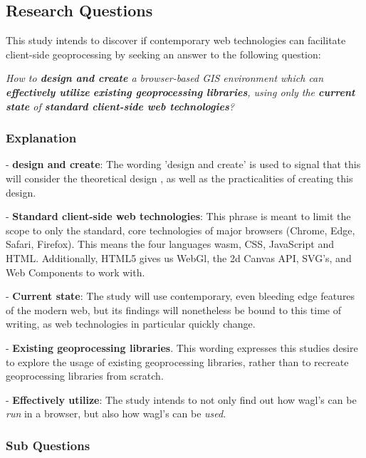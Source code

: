 \subsection{Research Questions}

This study intends to discover if contemporary web technologies can facilitate client-side geoprocessing by seeking an answer to the following question:  

\textit{How to \textbf{design and create} a browser-based GIS environment which can \textbf{effectively utilize} \textbf{existing geoprocessing libraries}, using only the \textbf{current state} of \textbf{standard client-side web technologies}?}

\subsubsection*{Explanation}


- \textbf{design and create}: The wording 'design and create' is used to signal that this will consider the theoretical design , as well as the practicalities of creating this design. 

- \textbf{Standard client-side web technologies}: This phrase is meant to limit the scope to only the standard, core technologies of major browsers (Chrome, Edge, Safari, Firefox). This means the four languages \ac{wasm}, CSS, JavaScript and HTML. Additionally, HTML5 gives us WebGl, the 2d Canvas API, SVG's, and Web Components to work with.

- \textbf{Current state}: The study will use contemporary, even bleeding edge features of the modern web, but its findings will nonetheless be bound to this time of writing, as web technologies in particular quickly change. 

- \textbf{Existing geoprocessing libraries}. This wording expresses this studies desire to explore the usage of existing geoprocessing libraries, rather than to recreate geoprocessing libraries from scratch.

- \textbf{Effectively utilize}: The study intends to not only find out how \ac{wagl}'s can be \textit{run} in a browser, but also how \ac{wagl}'s can be \textit{used}. 


\subsubsection*{Sub Questions}


